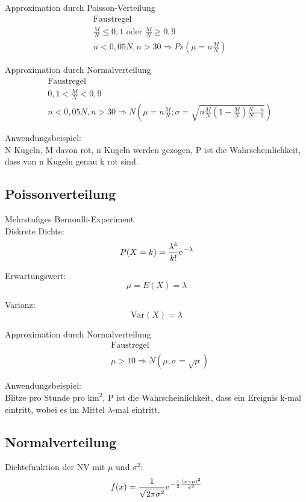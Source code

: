 Approximation durch Poisson-Verteilung
\begin{align*}
	& \text{Faustregel} \\
	& \frac{M}{N}\leq 0,1 \text{ oder } \frac{M}{N}\geq 0,9 \\
	& n < 0,05N, n > 30 \Rightarrow Ps\left(\mu = n\frac{M}{N}\right) 
\end{align*}

Approximation durch Normalverteilung
\begin{align*}
	& \text{Faustregel}  \\
	& 0,1 < \frac{M}{N} < 0,9  \\
	& n < 0,05N, n > 30 \Rightarrow N\left(\mu = n\frac{M}{N}; \sigma = \sqrt{n\frac{M}{N}\left(1-\frac{M}{N}\right)\frac{N-n}{N-1}}\right) 
\end{align*}

Anwendungsbeispiel:\\
N Kugeln, M davon rot, n Kugeln werden gezogen, P ist die Wahrscheinlichkeit, dass von n Kugeln genau k rot sind.

\subsection{Poissonverteilung}
\large{Mehrstufiges Bernoulli-Experiment}\\
Diskrete Dichte:
\begin{equation}
	P(X=k)=\frac{\lambda^k}{k!}\e^{-\lambda}
\end{equation}

Erwartungswert:
\begin{equation}
	\mu = E(X) = \lambda
\end{equation}

Varianz:
\begin{equation}
	\mathrm{Var}(X)=\lambda
\end{equation}

Approximation durch Normalverteilung
\begin{align*}
	& \text{Faustregel} \\
	& \mu > 10 \Rightarrow N(\mu; \sigma = \sqrt{\mu}) 
\end{align*}

Anwendungsbeispiel:\\
Blitze pro Stunde pro $\mathrm{km}^2$, P ist die Wahrscheinlichkeit, dass ein Ereignis k-mal eintritt, wobei es im Mittel $\lambda$-mal eintritt.

\clearpage

\subsection{Normalverteilung}
Dichtefunktion der NV mit $\mu$ und $\sigma^2$:
\begin{equation}
	f(x) = \frac{1}{\sqrt{2\pi\sigma^2}}\e^{-\frac{1}{2}\frac{(x-\mu)^2}{\sigma^2}}
\end{equation}

